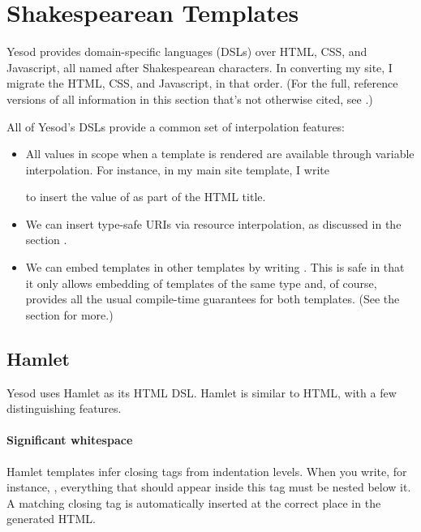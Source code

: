 \section{Shakespearean Templates}

Yesod provides domain-specific languages (DSLs) over HTML, CSS, and Javascript, all named after Shakespearean characters. In converting my site, I migrate the HTML, CSS, and Javascript, in that order. (For the full, reference versions of all information in this section that's not otherwise cited, see \cite{ybkShakes}.)

All of Yesod's DSLs provide a common set of interpolation features:

\begin{itemize}
  \item {} All values in scope when a template is rendered are available through variable interpolation. For instance, in my main site template, I write


    to insert the value of  as part of the HTML title.

  \item {} We can insert type-safe URIs via  resource interpolation, as discussed in the section .

  \item {} We can embed templates in other templates by writing . This is safe in that it only allows embedding of templates of the same type and, of course, provides all the usual compile-time guarantees for both templates. (See the  section for more.)
\end{itemize}

\subsection{Hamlet} \label{hamlet}

Yesod uses Hamlet as its HTML DSL. Hamlet is similar to HTML, with a few distinguishing features.

\paragraph{Significant whitespace} Hamlet templates infer closing tags from indentation levels. When you write, for instance, , everything that should appear inside this tag must be nested below it. A matching closing tag is automatically inserted at the correct place in the generated HTML. 

